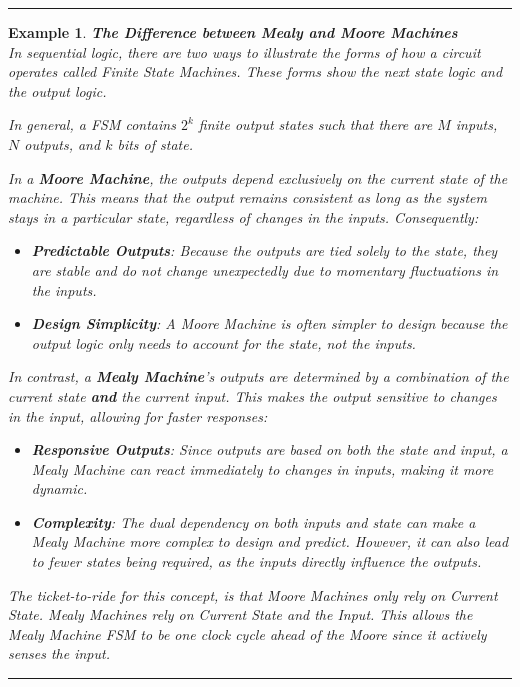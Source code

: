 \documentclass[12pt]{article}
\newtheorem{example}{Example}
\newenvironment{examp}
{
	\vspace{.5cm}
	\hrule
\begin{example}\upshape}
	{\hrule
		\vspace{0.5cm}
\end{example}}
\begin{document}
\begin{examp}
	\vspace{.5cm}
	\textbf{The Difference between Mealy and Moore Machines}\\
	In sequential logic, there are two ways to illustrate the forms of how a circuit
	operates called \textit{Finite State Machines}. These forms show the
	\textit{next state logic} and the \textit{output logic}.
	
	In general, a FSM contains \(2^k\) \textit{finite} output states such that
	there are \(M\) inputs, \(N\) outputs, and \(k\) bits of state.
	
	In a \textbf{Moore Machine}, the outputs depend exclusively on the \textit{current state} of the machine. This means that the output remains consistent as long as the system stays in a particular state, regardless of changes in the inputs. Consequently:
	\begin{itemize}
		\item \textbf{Predictable Outputs}: Because the outputs are tied solely to the state, they are stable and do not change unexpectedly due to momentary fluctuations in the inputs.
		\item \textbf{Design Simplicity}: A Moore Machine is often simpler to design because the output logic only needs to account for the state, not the inputs.
	\end{itemize}
	In contrast, a \textbf{Mealy Machine}’s outputs are determined by a combination of the \textit{current state} \textbf{and} the \textit{current input}. This makes the output sensitive to changes in the input, allowing for faster responses:
	
	\begin{itemize}
		\item \textbf{Responsive Outputs}: Since outputs are based on both the state and input, a Mealy Machine can react immediately to changes in inputs, making it more dynamic.
		      
		\item \textbf{Complexity}: The dual dependency on both inputs and state can make a Mealy Machine more complex to design and predict. However, it can also lead to fewer states being required, as the inputs directly influence the outputs.
	\end{itemize}
	
	The ticket-to-ride for this concept, is that Moore Machines only rely on
	Current State. Mealy Machines rely on Current State and the Input. This allows
	the Mealy Machine FSM to be one clock cycle ahead of the Moore since it
	actively senses the input.
	
\end{examp}
\end{document}
